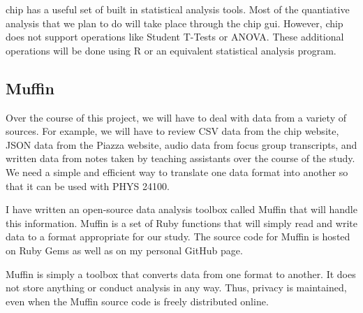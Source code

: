 \gls{chip} has a useful set of built in statistical analysis tools. Most of the quantiative analysis that we plan to do will take place through the \gls{chip} \gls{gui}. However, \gls{chip} does not support operations like Student T-Tests or ANOVA. These additional operations will be done using R or an equivalent statistical analysis program.

\subsection{Muffin}

Over the course of this project, we will have to deal with data from a variety of sources. For example, we will have to review CSV data from the \gls{chip} website, JSON data from the Piazza website, audio data from focus group transcripts, and written data from notes taken by teaching assistants over the course of the study. We need a simple and efficient way to translate one data format into another so that it can be used with PHYS 24100.

I have written an open-source data analysis toolbox called Muffin that will handle this information. Muffin is a set of Ruby functions that will simply read and write data to a format appropriate for our study. The source code for Muffin is hosted on Ruby Gems as well as on my personal GitHub page.

Muffin is simply a toolbox that converts data from one format to another. It does not store anything or conduct analysis in any way. Thus, privacy is maintained, even when the Muffin source code is freely distributed online.